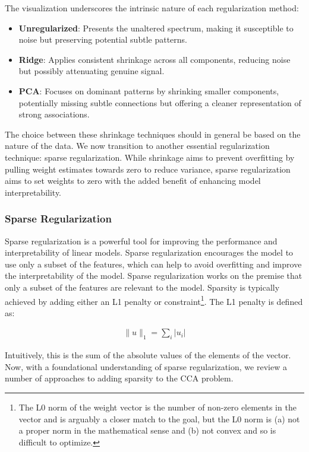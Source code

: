 The visualization underscores the intrinsic nature of each regularization method:
\begin{itemize}
    \item \textbf{Unregularized}: Presents the unaltered spectrum, making it susceptible to noise but preserving potential subtle patterns.
    \item \textbf{Ridge}: Applies consistent shrinkage across all components, reducing noise but possibly attenuating genuine signal.
    \item \textbf{PCA}: Focuses on dominant patterns by shrinking smaller components, potentially missing subtle connections but offering a cleaner representation of strong associations.
\end{itemize}
The choice between these shrinkage techniques should in general be based on the nature of the data.
We now transition to another essential regularization technique: sparse regularization.
While shrinkage aims to prevent overfitting by pulling weight estimates towards zero to reduce variance, sparse regularization aims to set weights to zero with the added benefit of enhancing model interpretability.

\subsubsection{Sparse Regularization}

Sparse regularization is a powerful tool for improving the performance and interpretability of linear models.
Sparse regularization encourages the model to use only a subset of the features, which can help to avoid overfitting and improve the interpretability of the model.
Sparse regularization works on the premise that only a subset of the features are relevant to the model.
Sparsity is typically achieved by adding either an L1 penalty or constraint\footnote{The L0 norm of the weight vector is the number of non-zero elements in the vector and is arguably a closer match to the goal, but the L0 norm is (a) not a proper norm in the mathematical sense and (b) not convex and so is difficult to optimize.}.
The L1 penalty is defined as:

\begin{align}
    \|u\|_1 = \sum_i |u_i|
\end{align}

Intuitively, this is the sum of the absolute values of the elements of the vector.
Now, with a foundational understanding of sparse regularization, we review a number of approaches to adding sparsity to the CCA problem.

